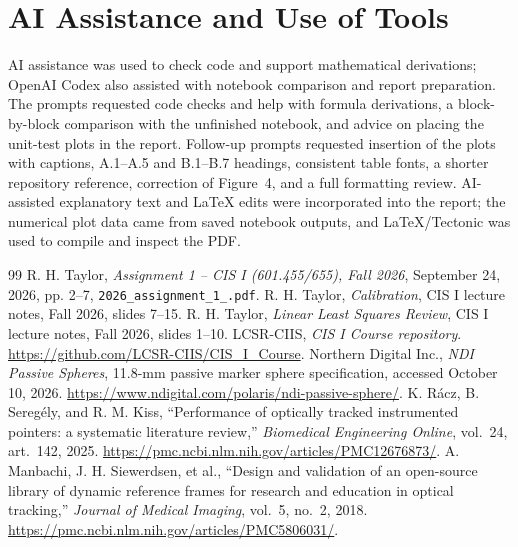 \documentclass[11pt]{article}
\begin{document}
\section{AI Assistance and Use of Tools}
AI assistance was used to check code and support mathematical derivations;
OpenAI Codex also assisted with notebook comparison and report preparation.
The prompts requested code checks and help with formula derivations, a
block-by-block comparison with the unfinished notebook, and advice on placing
the unit-test plots in the report.  Follow-up prompts requested insertion of
the plots with captions, A.1--A.5 and B.1--B.7 headings, consistent table
fonts, a shorter repository reference, correction of Figure~4, and a full
formatting review.  AI-assisted explanatory text and LaTeX edits were
incorporated into the report; the numerical plot data came from saved notebook
outputs, and LaTeX/Tectonic was used to compile and inspect the PDF.

\clearpage
\begin{thebibliography}{99}
 R. H. Taylor, \emph{Assignment 1 -- CIS I (601.455/655), Fall 2026}, September 24, 2026, pp. 2--7, \texttt{2026\_assignment\_1\_.pdf}.
 R. H. Taylor, \emph{Calibration}, CIS I lecture notes, Fall 2026, slides 7--15.
 R. H. Taylor, \emph{Linear Least Squares Review}, CIS I lecture notes, Fall 2026, slides 1--10.
 LCSR-CIIS, \emph{CIS I Course repository}.
\url{https://github.com/LCSR-CIIS/CIS_I_Course}.
 Northern Digital Inc., \emph{NDI Passive Spheres},
11.8-mm passive marker sphere specification, accessed October 10, 2026.
\url{https://www.ndigital.com/polaris/ndi-passive-sphere/}.
 K. R\'acz, B. Sereg\'ely, and R. M. Kiss,
``Performance of optically tracked instrumented pointers: a systematic
literature review,'' \emph{Biomedical Engineering Online}, vol.~24, art.~142,
2025.
\url{https://pmc.ncbi.nlm.nih.gov/articles/PMC12676873/}.
 A. Manbachi, J. H. Siewerdsen, et al., ``Design and
validation of an open-source library of dynamic reference frames for research
and education in optical tracking,'' \emph{Journal of Medical Imaging},
vol.~5, no.~2, 2018.
\url{https://pmc.ncbi.nlm.nih.gov/articles/PMC5806031/}.
\end{thebibliography}
\end{document}
